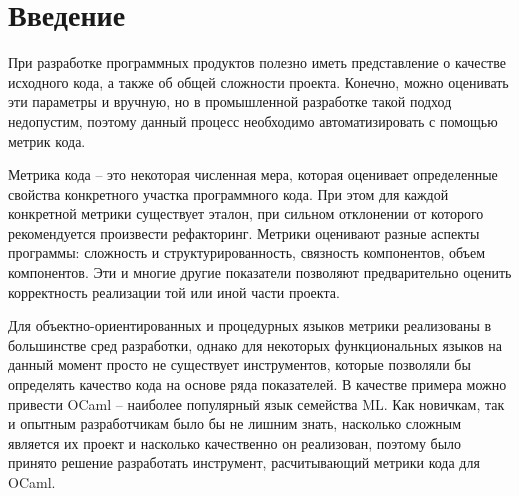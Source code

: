 


\usepackage{caption}
\usepackage{listings}
\usepackage{hyperref}
\usepackage{xcolor}
\hypersetup{pdfstartview=FitH,  linkcolor=linkcolor,urlcolor=urlcolor, colorlinks=true}



\large

\maketitle
\newpage
\tableofcontents %
\newpage
\section{Введение}
При разработке программных продуктов полезно иметь представление
о качестве исходного кода, а также об общей сложности проекта. 
Конечно, можно оценивать эти параметры и вручную, но в промышленной разработке такой подход недопустим, поэтому данный процесс необходимо автоматизировать с помощью метрик кода.

Метрика кода -- это некоторая численная мера, которая оценивает определенные свойства конкретного участка программного кода. При этом для каждой конкретной метрики существует эталон, при сильном отклонении от которого рекомендуется произвести рефакторинг. Метрики оценивают разные аспекты программы: сложность и структурированность, связность компонентов, объем компонентов. Эти и многие другие показатели позволяют предварительно оценить корректность реализации той или иной части проекта.

Для объектно-ориентированных и процедурных языков метрики реализованы в большинстве сред разработки, однако для некоторых функциональных языков на данный момент просто не существует инструментов, которые позволяли бы определять качество кода на основе ряда показателей. В качестве примера можно привести OCaml -- наиболее популярный язык семейства ML. Как новичкам, так и опытным разработчикам было бы не лишним знать, насколько сложным
является их проект и насколько качественно он реализован,  поэтому было принято решение разработать инструмент, расчитывающий метрики кода для OCaml.

